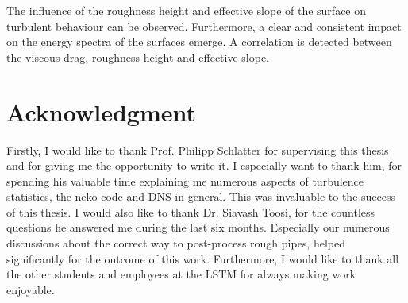 \documentclass[
 	11pt,                 				%
  	notitlepage,          				%
  	twoside, 			   				%
 	bibliography=totoc,
  	listof=totoc,
  	headsepline,         				%
  	footsepline,         				%
  cleardoublepage=empty,				%
  numbers=noenddot,
]{scrreprt}
\begin{document}
The influence of the roughness height and effective slope of the surface on turbulent behaviour can be observed.
Furthermore, a clear and consistent impact on the energy spectra of the surfaces emerge.
A correlation is detected between the viscous drag, roughness height and effective slope.

\chapter*{Acknowledgment}

Firstly, I would like to thank Prof. Philipp Schlatter for supervising this thesis and for giving me the opportunity to write it.
I especially want to thank him, for spending his valuable time explaining me numerous aspects of turbulence statistics, the neko code and DNS in general.
This was invaluable to the success of this thesis.
I would also like to thank Dr. Siavash Toosi, for the countless questions he answered me during the last six months.
Especially our numerous discussions about the correct way to post-process rough pipes, helped significantly for the outcome of this work.
Furthermore, I would like to thank all the other students and employees at the LSTM for always making work enjoyable.






\clearpage
\thispagestyle{empty}
\null
\clearpage
\thispagestyle{empty}
\null
\clearpage

\clearpage
\pagestyle{plain}





\pagestyle{headings}




\tableofcontents

\listoffigures

\listoftables

\newpage


\end{document}
